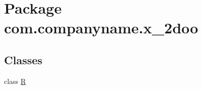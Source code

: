 \hypertarget{namespacecom_1_1companyname_1_1x__2doo}{
\section{Package com.companyname.x\_\-2doo}
\label{namespacecom_1_1companyname_1_1x__2doo}
}
\subsection*{Classes}
\begin{CompactItemize}
\item 
class \hyperlink{classcom_1_1companyname_1_1x__2doo_1_1_r}{R}
\end{CompactItemize}
